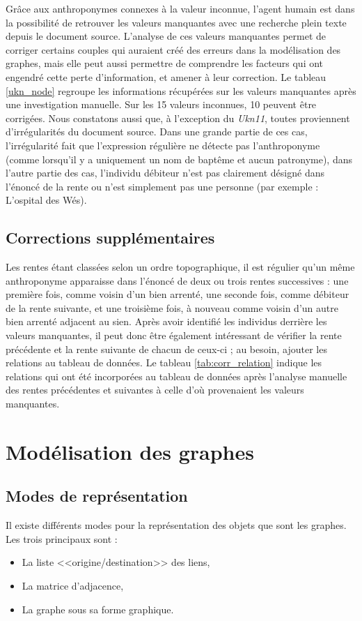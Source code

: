  Grâce aux anthroponymes connexes à la valeur inconnue, l'agent humain est dans la possibilité de retrouver les valeurs manquantes avec une recherche plein texte depuis le document source. L'analyse de ces valeurs manquantes permet de corriger certains couples qui auraient créé des erreurs dans la modélisation des graphes,  mais elle peut aussi permettre de comprendre les facteurs qui ont engendré cette perte d'information, et amener à leur correction. Le tableau \ref{ukn_node} regroupe les informations récupérées sur les valeurs manquantes après une investigation manuelle. Sur les 15 valeurs inconnues, 10 peuvent être corrigées. Nous constatons aussi que, à l'exception du \textit{Ukn11}, toutes proviennent d'irrégularités du document source. Dans une grande partie de ces cas, l'irrégularité fait que l'expression régulière ne détecte pas l'anthroponyme (comme lorsqu'il y a uniquement un nom de baptême et aucun patronyme), dans l'autre partie des cas, l'individu débiteur n'est pas clairement désigné dans l'énoncé de la rente ou  n'est simplement pas une personne (par exemple : L'ospital des Wés).


\subsection{Corrections supplémentaires}
Les rentes étant classées selon un ordre topographique, il est régulier qu'un même anthroponyme apparaisse dans l'énoncé de deux ou trois rentes successives : une première fois, comme voisin d'un bien arrenté, une seconde fois, comme débiteur de la rente suivante, et une troisième fois, à nouveau comme voisin d'un autre bien arrenté adjacent au sien. Après avoir identifié les individus derrière les valeurs manquantes, il peut donc être également  intéressant de vérifier la rente précédente  et la rente suivante de chacun de ceux-ci ; au besoin, ajouter les relations  au tableau de données. Le tableau \ref{tab:corr_relation} indique les relations qui ont été incorporées au tableau de données après l'analyse manuelle des rentes précédentes et suivantes à celle d'où provenaient les valeurs manquantes.

 
\section{Modélisation des graphes}
\subsection{Modes de représentation}
Il existe différents modes pour la représentation des objets que sont les graphes. Les trois principaux sont :
\begin{itemize}
    \item La liste <<origine/destination>> des liens,
    \item La matrice d'adjacence,
    \item La graphe sous sa forme graphique.
\end{itemize}


